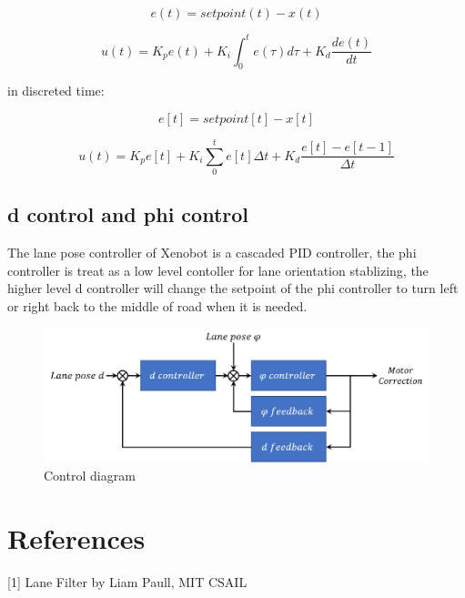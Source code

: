 \documentclass{article}
\begin{document}
\[e(t) = setpoint(t) - x(t)\]

\[u(t) = K_p e(t) + K_i \int_{0}^{t} e(\tau) d\tau + K_d  \frac{de(t)}{dt}\]

in discreted time:

\[e[t] = setpoint[t] - x[t]\]

\[u(t) = K_p e[t] + K_i \sum_0^t e[t] \Delta t + K_d \frac{e[t] - e[t-1]}{\Delta t}\]

\subsection{d control and phi control}

The lane pose controller of Xenobot is a cascaded PID controller, the phi controller is treat as a low level contoller for lane orientation stablizing, the higher level d controller will change the setpoint of the phi controller to turn left or right back to the middle of road when it is needed.

\begin{figure}[ht]
  \label{fig:control_diagram}
  \centering
  \includegraphics[scale=0.6]{graphs/control_diagram.PNG}
  \caption{Control diagram}
\end{figure}
\FloatBarrier

\clearpage

\section{References}

[1] Lane Filter by Liam Paull, MIT CSAIL
\end{document}
